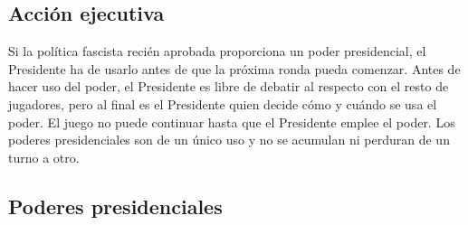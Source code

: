 \documentclass[13pt,a4paper,twocolumn,titlepage]{scrartcl}
\begin{document}
	\subsection*{Acción ejecutiva}
	Si la política \textcolor{fascist}{fascista} recién aprobada proporciona un poder presidencial, el Presidente ha de usarlo antes de que la próxima ronda pueda comenzar.  Antes de hacer uso del poder, el Presidente es libre de debatir al respecto con el resto de jugadores, pero al final es el Presidente quien decide cómo y cuándo se usa el poder. El juego no puede continuar hasta que el Presidente emplee el poder. Los poderes presidenciales son de un único uso y no se acumulan ni perduran de un turno a otro.
	
	\subsection*{Poderes presidenciales}
\end{document}
